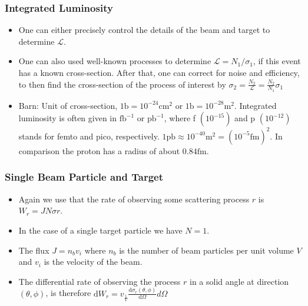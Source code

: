 \subsubsection{Integrated Luminosity}
\begin{itemize}
    \item One can either precisely control the details of the beam and target to determine $\mathcal{L}$.
    \item One can also used well-known processes to determine $\mathcal{L} = N_1 / σ_1$, if this event has a known cross-section. After that, one can correct for noise and efficiency, to then find the cross-section of the process of interest by $σ_2 = \frac{N_2}{\mathcal{L}} = \frac{N_2}{N_1} σ_1$
    \item Barn: Unit of cross-section, $1 \text{b} = 10^{-24} \text{cm}^2$ or $1 \text{b} = 10^{-28} \text{m}^2$. Integrated luminosity is often given in $\text{fb}^{-1}$ or $\text{pb}^{-1}$, where f $(10^{-15})$ and p $(10^{-12})$ stands for femto and pico, respectively. $1\text{pb} ≈ 10^{-40}\text{m}^2 = (10^{-5}\text{fm})^2$. In comparison the proton has a radius of about $0.84\text{fm}$.
\end{itemize}


\subsubsection{Single Beam Particle and Target}
\begin{itemize}
    \item Again we use that the rate of observing some scattering process $r$ is $W_r = JNσr$. 
    \item In the case of a single target particle we have $N = 1$. 
    \item The flux $J = n_{b} v_i$ where $n_{b}$ is the number of beam particles per unit volume $V$ and $v_i$ is the velocity of the beam. 
    \item The differential rate of observing the process $r$ in a solid angle at direction $(θ,ϕ)$, is therefore $ \displaystyle \mathrm{d}W_r = v_\frac{i}{V} \frac{\mathrm{d}σ_r(θ,ϕ)}{\mathrm{d}Ω}dΩ$
\end{itemize}

